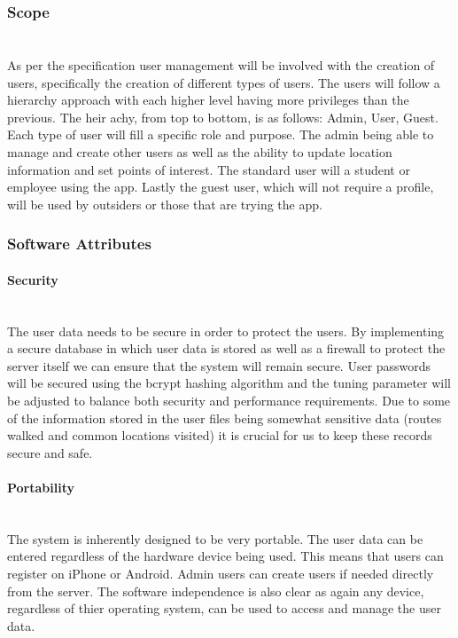 \subsubsection{Scope}
\paragraph{}
\mbox{}\\
As per the specification user management will be involved with the creation of users, specifically the creation of different types of users. The users will follow a hierarchy approach with each higher level having more privileges than the previous. The heir achy, from top to bottom, is as follows: Admin, User, Guest. Each type of user will fill a specific role and purpose. The admin being able to manage and create other users as well as the ability to update location information and set points of interest. The standard user will a student or employee using the app. Lastly the guest user, which will not require a profile, will be used by outsiders or those that are trying the app.

\subsubsection{Software Attributes}
\paragraph{Security}
\mbox{}\\
The user data needs to be secure in order to protect the users. By implementing a secure database in which user data is stored as well as a firewall to protect the server itself we can ensure that the system will remain secure. User passwords will be secured using the bcrypt hashing algorithm and the tuning parameter will be adjusted to balance both security and performance requirements. Due to some of the information stored in the user files being somewhat sensitive data (routes walked and common locations visited) it is crucial for us to keep these records secure and safe.

\paragraph{Portability}
\mbox{}\\
The system is inherently designed to be very portable. The user data can be entered regardless of the hardware device being used. This means that users can register on iPhone or Android. Admin users can create users if needed directly from the server. The software independence is also clear as again any device,  regardless of thier operating system, can be used to access and manage the user data. 

